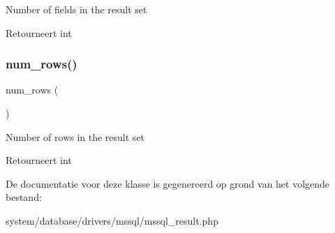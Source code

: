 Number of fields in the result set

\begin{DoxyReturn}{Retourneert}
int 
\end{DoxyReturn}
\mbox{\label{class_c_i___d_b__mssql__result_a218657c303ee499b97710ab0cd2f5d6e}} 
\subsubsection{\texorpdfstring{num\_rows()}{num\_rows()}}
{\footnotesize\ttfamily num\+\_\+rows (\begin{DoxyParamCaption}{ }\end{DoxyParamCaption})}

Number of rows in the result set

\begin{DoxyReturn}{Retourneert}
int 
\end{DoxyReturn}


De documentatie voor deze klasse is gegenereerd op grond van het volgende bestand\+:\begin{DoxyCompactItemize}
\item 
system/database/drivers/mssql/mssql\+\_\+result.\+php\end{DoxyCompactItemize}
